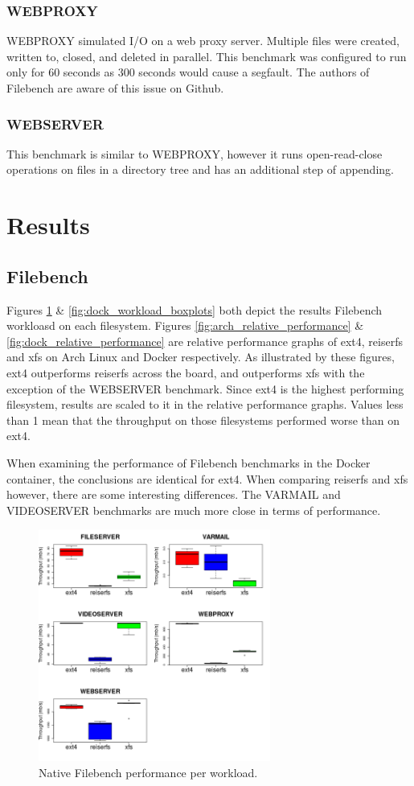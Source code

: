 \documentclass[letterpaper,twocolumn,10pt]{article}
\begin{document}
\subsubsection{WEBPROXY}
WEBPROXY simulated I/O on a web proxy server. Multiple files were created, written to, closed, and deleted in parallel. This benchmark was configured to run only for 60 seconds as 300 seconds would cause a segfault. The authors of Filebench are aware of this issue on Github.

\subsubsection{WEBSERVER}
This benchmark is similar to WEBPROXY, however it runs open-read-close operations on files in a directory tree and has an additional step of appending. 

\section{Results}
\subsection{Filebench}
Figures \ref{fig:arch_workload_boxplots} \& \ref{fig:dock_workload_boxplots} both depict the results Filebench workloasd on each filesystem. Figures \ref{fig:arch_relative_performance} \& \ref{fig:dock_relative_performance} are relative performance graphs of ext4, reiserfs and xfs on Arch Linux and Docker respectively. As illustrated by these figures, ext4 outperforms reiserfs across the board, and outperforms xfs with the exception of the WEBSERVER benchmark. Since ext4 is the highest performing filesystem, results are scaled to it in the relative performance graphs. Values less than 1 mean that the throughput on those filesystems performed worse than on ext4. 

When examining the performance of Filebench benchmarks in the Docker container, the conclusions are identical for ext4. When comparing reiserfs and xfs however, there are some interesting differences. The VARMAIL and VIDEOSERVER benchmarks are much more close in terms of performance. 


\begin{figure}[!ht]
\centering
\includegraphics[width=3in]{../results/arch_workload_boxplots.png}
\caption{Native Filebench performance per workload.}
\label{fig:arch_workload_boxplots}
\end{figure}
\end{document}
